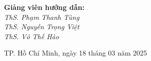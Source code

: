\begin{titlepage}
\begin{center}
\begin{minipage}{0.75\textwidth}
            \vspace{0.6cm}

            \textbf{\large Giảng viên hướng dẫn:}\\[5pt]
            \textit{ThS. Phạm Thanh Tùng}\\
            \textit{ThS. Nguyễn Trọng Việt}\\
            \textit{ThS. Võ Thế Hào}
        \end{minipage}

        \vspace{1.0cm}

        {\fontsize{12}{14}\selectfont TP. Hồ Chí Minh, ngày 18 tháng 03 năm 2025}
    \end{center}
\end{titlepage}